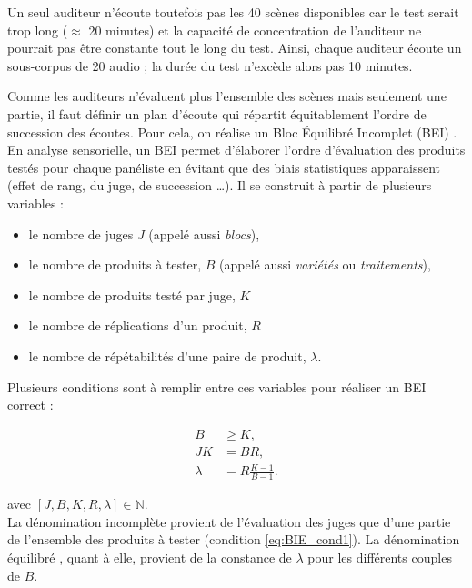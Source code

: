 


Un seul auditeur n'écoute toutefois pas les 40 scènes disponibles car le test serait trop long ($\approx$ 20 minutes) et la capacité de concentration de l'auditeur ne pourrait pas être constante tout le long du test. Ainsi, chaque auditeur écoute un sous-corpus de 20 audio ; la durée du test n'excède alors pas 10 minutes. 

Comme les auditeurs n'évaluent plus l'ensemble des scènes mais seulement une partie, il faut définir un plan d'écoute qui répartit équitablement l'ordre de succession des écoutes. Pour cela, on réalise un \og Bloc Équilibré Incomplet \fg{} (BEI) \cite{pages_blocs_2007}. \\


En analyse sensorielle, un BEI permet d'élaborer l'ordre d'évaluation des produits testés pour chaque panéliste en évitant que des biais statistiques apparaissent (effet de rang, du juge, de succession \dots). Il se construit à partir de plusieurs variables :

\begin{itemize}
\item le nombre de juges $J$ (appelé aussi \textit{blocs}), 
\item le nombre de produits à tester, $B$ (appelé aussi \textit{variétés} ou \textit{traitements}),
\item le nombre de produits testé par juge, $K$
\item le nombre de réplications d'un produit, $R$
\item le nombre de répétabilités d'une paire de produit, $\lambda$.\\
\end{itemize}

Plusieurs conditions sont à remplir entre ces variables pour réaliser un BEI correct : 

\begin{subequations}\label{BIE_cond}
\begin{align}
B &\geq K, \label{eq:BIE_cond1}\\
JK &= BR, \label{eq:BIE_cond2}\\
\lambda &= R\frac{K-1}{B-1}. \label{eq:BIE_cond3}
\end{align}
\end{subequations}

avec $\left[J, B, K, R, \lambda\right] \in \mathbb{N}$.\\

La dénomination \og incomplète \fg{} provient de l'évaluation des juges que d'une partie de l'ensemble des produits à tester (condition \ref{eq:BIE_cond1}). La dénomination \og équilibré \fg{}, quant à elle, provient de la constance de $\lambda$ pour les différents couples de $B$. \\

